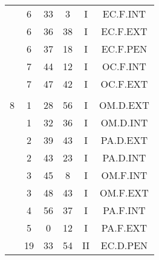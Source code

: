 \documentclass[12pt, a4paper]{article}
\begin{document}
\begin{multicols}{3}
{\begin{tabular}{c c c c c c}
	 	 	 	 & 6 & 33 & 3 & I & EC.F.INT\\%
	 	 	 	 & 6 & 36 & 38 & I & EC.F.EXT\\%
	 	 	 	 & 6 & 37 & 18 & I & EC.F.PEN\\%
	 	 	 	 & 7 & 44 & 12 & I & OC.F.INT\\%
	 	 	 	 & 7 & 47 & 42 & I & OC.F.EXT\\%
	 	 	 	 & & & & & \\%
	 	 	 	8 & 1 & 28 & 56 & I & OM.D.EXT\\%
	 	 	 	 & 1 & 32 & 36 & I & OM.D.INT\\%
	 	 	 	 & 2 & 39 & 43 & I & PA.D.EXT\\%
	 	 	 	 & 2 & 43 & 23 & I & PA.D.INT\\%
	 	 	 	 & 3 & 45 & 8 & I & OM.F.INT\\%
	 	 	 	 & 3 & 48 & 43 & I & OM.F.EXT\\%
	 	 	 	 & 4 & 56 & 37 & I & PA.F.INT\\%
	 	 	 	 & 5 & 0 & 12 & I & PA.F.EXT\\%
	 	 	 	 & 19 & 33 & 54 & II & EC.D.PEN\\%
	 	 \end{tabular}
 	}
\end{multicols}
\end{document}
